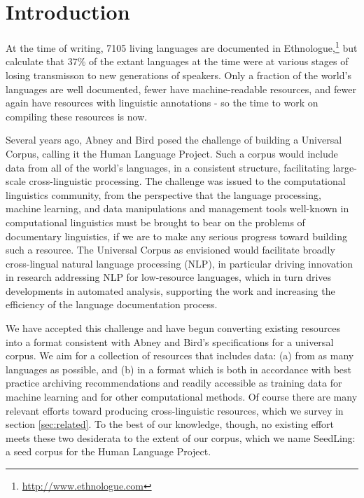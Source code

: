 \section{Introduction} \label{sec:intro}

At the time of writing, 7105 living languages are documented in Ethnologue,\footnote{\url{http://www.ethnologue.com}} but  calculate that 37\% of the extant languages at the time were at various stages of losing transmisson to new generations of speakers.
Only a fraction of the world's languages are well documented, fewer have machine-readable resources, and fewer again have resources with linguistic annotations \cite{maxwell2006annotation} - so the time to work on compiling these resources is now.

Several years ago, Abney and Bird  posed the challenge of building a Universal Corpus, calling it the Human Language Project. Such a corpus would include data from all of the world's languages, in a consistent structure, facilitating large-scale cross-linguistic processing. The challenge was issued to the computational linguistics community, from the perspective that the language processing, machine learning, and data manipulations and management tools well-known in computational linguistics must be brought to bear on the problems of documentary linguistics, if we are to make any serious progress toward building such a resource. The Universal Corpus as envisioned would facilitate broadly cross-lingual natural language processing (NLP), in particular driving innovation in research addressing NLP for low-resource languages, which in turn drives developments in automated analysis, supporting the work and increasing the efficiency of the language documentation process. 

We have accepted this challenge and have begun converting existing resources into a format consistent with Abney and Bird's specifications for a universal corpus. We aim for a collection of resources that includes data: (a) from as many languages as possible, and (b) in a format which is both in accordance with best practice archiving recommendations and readily accessible as training data for machine learning and for other computational methods. Of course there are many relevant efforts toward producing cross-linguistic resources, which we survey in section \ref{sec:related}. To the best of our knowledge, though, no existing effort meets these two desiderata to the extent of our corpus, which we name SeedLing: a seed corpus for the Human Language Project.

